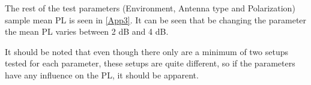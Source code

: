 The rest of the test parameters (Environment, Antenna type and Polarization) sample mean PL is seen in \autoref{App3}. It can be seen that be changing the parameter the mean PL varies between 2 dB and 4 dB.

\begin{table}[H]
\centering
\caption{Difference bewteen setups of different parameters.}
\label{App3}
\end{table}


It should be noted that even though there only are a minimum of two setups tested for each parameter, these setups are quite different, so if the parameters have any influence on the PL, it should be apparent. 






 

